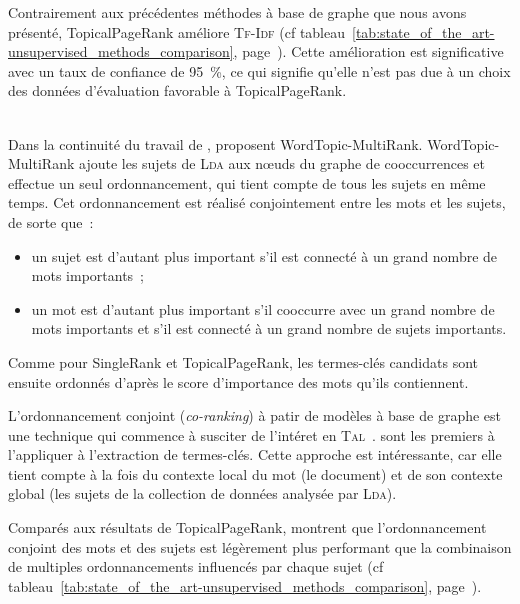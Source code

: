         Contrairement aux précédentes méthodes à base de graphe que nous avons
        présenté, TopicalPageRank améliore \textsc{Tf-Idf} (cf
        tableau~\ref{tab:state_of_the_art-unsupervised_methods_comparison},
        page~\pageref{tab:state_of_the_art-unsupervised_methods_comparison}).
        Cette amélioration est significative avec un taux de confiance de 95~\%,
        ce qui signifie qu'elle n'est pas due à un choix des données
        d'évaluation favorable à TopicalPageRank.

        ~\\Dans la continuité du travail de ,
         proposent WordTopic-MultiRank.
        WordTopic-MultiRank ajoute les sujets de \textsc{Lda} aux n\oe{}uds du
        graphe de cooccurrences et effectue un seul ordonnancement, qui tient
        compte de tous les sujets en même temps. Cet ordonnancement est réalisé
        conjointement entre les mots et les sujets, de sorte que~:
        \begin{itemize}
          \item{un sujet est d'autant plus important s'il est connecté à un
                grand nombre de mots importants~;}
          \item{un mot est d'autant plus important s'il cooccurre avec un grand
                nombre de mots importants et s'il est connecté à un grand nombre
                de sujets importants.}
        \end{itemize}
        Comme pour SingleRank et TopicalPageRank, les termes-clés candidats sont
        ensuite ordonnés d'après le score d'importance des mots qu'ils
        contiennent.

        L'ordonnancement conjoint (\textit{co-ranking}) à patir de modèles à
        base de graphe est une technique qui commence à susciter de l'intéret en
        \textsc{Tal}~\cite{wan2011corankingsummarization,yan2012corankingtweetrecommendation,liu2014corankingopinionmining}.
         sont les premiers à l'appliquer à
        l'extraction de termes-clés. Cette approche est intéressante, car elle
        tient compte à la fois du contexte local du mot (le document) et de son
        contexte global (les sujets de la collection de données analysée par
        \textsc{Lda}).

        Comparés aux résultats de TopicalPageRank,
         montrent que l'ordonnancement
        conjoint des mots et des sujets est légèrement plus performant que la
        combinaison de multiples ordonnancements influencés par chaque sujet
        (cf tableau~\ref{tab:state_of_the_art-unsupervised_methods_comparison},
        page~\pageref{tab:state_of_the_art-unsupervised_methods_comparison}).

